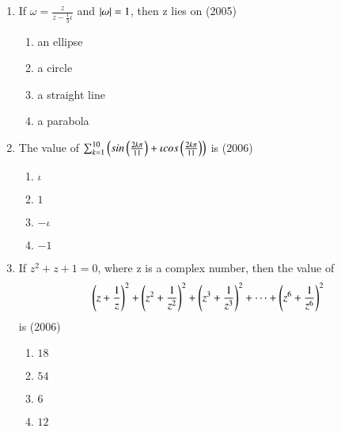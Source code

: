 \documentclass[journal,12pt,twocolumn]{IEEEtran}
\theoremstyle{remark}
\begin{document}
\begin{enumerate}
	\item{If $\omega = \frac{z}{z-\frac{1}{3}\iota}$ and $\left\vert\omega\right\vert = 1$, then z lies on \hfill (2005)
		\begin{multicols}{2}
		\begin{enumerate}
			\item{an ellipse}
			\item{a circle}
			\columnbreak
			\item{a straight line}
			\item{a parabola}
		\end{enumerate}
		\end{multicols}}

	\item{The value of $\sum_{k=1}^{10}\left(sin\left(\frac{2k\pi}{11}\right)+\iota cos\left(\frac{2k\pi}{11}\right)\right)$ is 
		\hfill (2006)
		\begin{multicols}{4}
		\begin{enumerate}
			\item{$\iota$}
			\columnbreak
			\item{$1$}
			\columnbreak
			\item{$-\iota$}
			\columnbreak
			\item{$-1$}
		\end{enumerate}
		\end{multicols}}

	\item{If $z^2 + z + 1 = 0$, where z is a complex number, then the value of $$\left(z+\frac{1}{z}\right)^2 + \left(z^2+\frac{1}{z^2}\right)^2 +\left(z^3+ \frac{1}{z^3}\right)^2 + \dots + \left(z^6+\frac{1}{z^6}\right)^2 $$ is \hfill (2006)
		\begin{multicols}{4}
		\begin{enumerate}
			\item{$18$}
			\columnbreak
			\item{$54$}
			\columnbreak
			\item{$6$}
			\columnbreak
			\item{$12$}
		\end{enumerate}
		\end{multicols}}

\end{enumerate}
\end{document}

